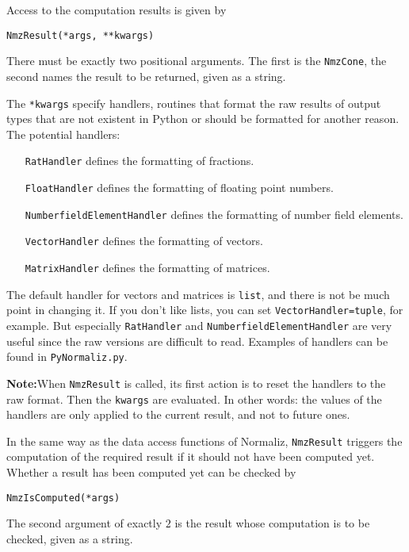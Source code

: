 \begin{small}
Access to the computation results is given by
\begin{Verbatim}
NmzResult(*args, **kwargs)
\end{Verbatim}
There must be exactly two positional arguments. The first is the \verb|NmzCone|, the second names the result to be returned, given as a string.

The \verb|*kwargs| specify handlers, routines that format the raw results of output types that are not existent in Python or should be formatted for another reason. The potential handlers:
\begin{itemize}
	\item[\texttt{RatHandler}] defines the formatting of fractions.
	
	\item[\texttt{FloatHandler}] defines the formatting of floating point numbers.
	
	\item[\texttt{NumberfieldElementHandler}] defines the formatting of number field elements.
	
	\item[\texttt{VectorHandler}] defines the formatting of vectors.
	
	\item[\texttt{MatrixHandler}] defines the formatting of matrices.
\end{itemize}

The default handler for vectors and matrices is \verb|list|, and there is not be much point in changing it. If you don't like lists, you can set \verb|VectorHandler=tuple|, for example. But especially \verb|RatHandler| and \verb|NumberfieldElementHandler| are very useful since the raw versions are difficult to read. Examples of handlers can be found in \verb|PyNormaliz.py|.

\textbf{Note:}\enspace When \verb|NmzResult| is called, its first action is to reset the handlers to the raw format. Then the \verb|kwargs| are evaluated. In other words: the values of the handlers are only applied to the current result, and not to future ones.

In the same way as the data access functions of Normaliz, \verb|NmzResult| triggers the computation of the required result if it should not have been computed yet. Whether a result has been computed yet can be checked by
\begin{Verbatim}
NmzIsComputed(*args)
\end{Verbatim}
The second argument of exactly $2$ is the result whose computation is to be checked, given as a string.


\end{small}
